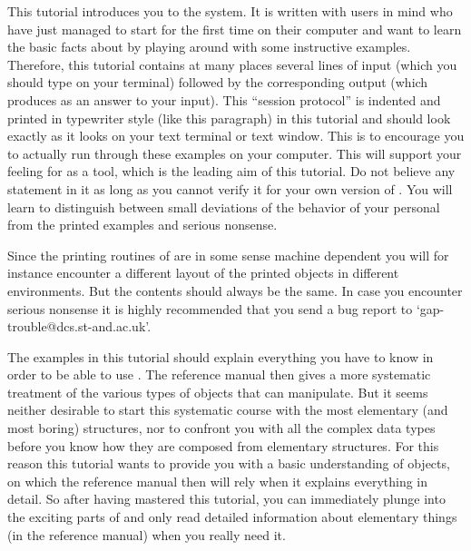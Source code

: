 


This tutorial introduces you to  the {\GAP}  system.  It is written  with
users in mind who have just managed to start {\GAP} for the first time on
their computer and want to learn the basic facts  about {\GAP} by playing
around with some instructive  examples. Therefore, this tutorial contains
at many  places several lines of  input  (which you  should type  on your
terminal) followed by the corresponding output  (which {\GAP} produces as
an answer to your input).
\begintt
This ``session protocol'' is indented and printed in typewriter style
(like this paragraph) in this tutorial and should look exactly as it
looks on your text terminal or text window.
\endtt
This is  to encourage you to actually  run through these examples on your
computer. This will support your  feeling for {\GAP}  as a tool, which is
the leading aim of this  tutorial. Do not believe any  statement in it as
long  as you cannot verify  it for your own  version of  {\GAP}. You will
learn to distinguish  between small  deviations of  the behavior of  your
personal {\GAP} from the printed examples and serious nonsense.

Since the printing routines of {\GAP} are in some sense machine dependent
you will for instance encounter a different layout of the printed objects
in different environments.  But the  contents should always be the  same.
In case you encounter serious nonsense  it is highly recommended that you
send a bug report to `gap-trouble@dcs.st-and.ac.uk'.

The examples in this tutorial should  explain everything you have to know
in order to be able to use {\GAP}. The reference manual then gives a more
systematic  treatment of  the various types  of objects  that  {\GAP} can
manipulate.  But it  seems neither  desirable   to start this  systematic
course with  the  most elementary (and most   boring) structures, nor  to
confront you with all the complex data types before you know how they are
composed from elementary structures. For this reason
this tutorial wants to  provide you with a  basic understanding of {\GAP}
objects, on  which the reference manual  then will rely when  it explains
everything in detail.  So  after having mastered  this tutorial, you  can
immediately  plunge   into the exciting  parts  of  {\GAP} and  only read
detailed information about elementary   things (in the reference  manual)
when you really need it.

